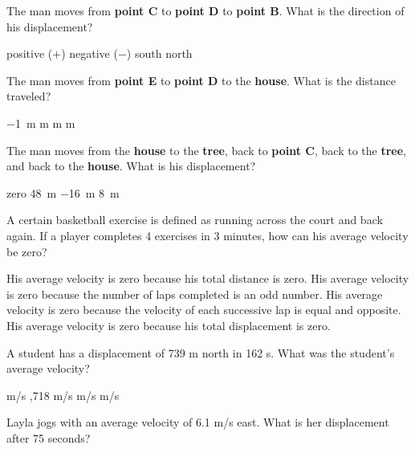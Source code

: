 \documentclass[addpoints]{exam}
\begin{document}
\begin{questions}
\question
The man moves from \textbf{point C} to \textbf{point D} to \textbf{point B}. What is the direction of his displacement?

\begin{choices}
\choice positive ($+$)
\CorrectChoice negative ($-$)
\choice south
\choice north
\end{choices}

\question
The man moves from \textbf{point E} to \textbf{point D} to the \textbf{house}. What is the distance traveled?

\begin{choices}
\choice \SI{-1}{m}
 m
 m
 m
\end{choices}


\question
The man moves from the \textbf{house} to the \textbf{tree}, back to \textbf{point C}, back to the \textbf{tree}, and back to the \textbf{house}. What is his displacement?

\begin{choices}
\CorrectChoice zero
\choice \SI{48}{m}
\choice \SI{-16}{m}
\choice \SI{8}{m}
\end{choices}







\question %
A certain basketball exercise is defined as running across the court and back again. If a player completes 4 exercises in 3 minutes, how can his average velocity be zero?
\begin{choices}
\choice His average velocity is zero because his total distance is zero.
\choice His average velocity is zero because the number of laps completed is an odd number.
\choice His average velocity is zero because the velocity of each successive lap is equal and opposite.
\CorrectChoice His average velocity is zero because his total displacement is zero.
\end{choices}

\question %
A student has a displacement of 739 m north in 162 s. What was the student's average velocity?

\begin{choices}
 m/s
,718 m/s
 m/s
 m/s
\end{choices}

\question %
Layla jogs with an average velocity of 6.1 m/s east. What is her displacement after 75 seconds?


\end{questions}
\end{document}
